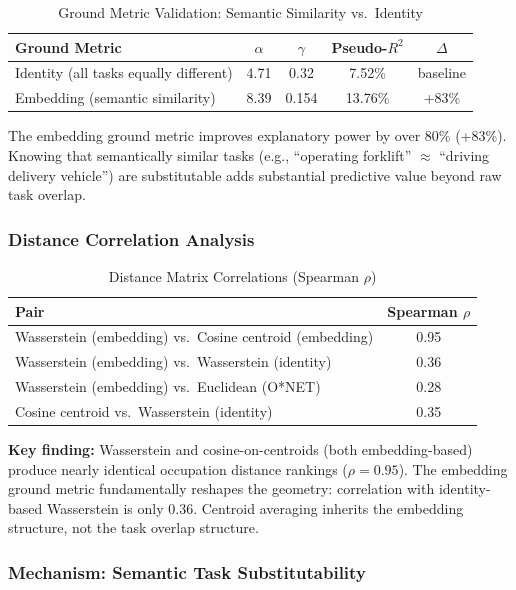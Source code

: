 \documentclass[12pt]{article}
\begin{document}
\begin{table}[h!]
\centering
\caption{Ground Metric Validation: Semantic Similarity vs.\ Identity}
\label{tab:ground-metric}
\begin{tabular}{lcccc}
\toprule
\textbf{Ground Metric} & $\alpha$ & $\gamma$ & Pseudo-$R^2$ & $\Delta$ \\
\midrule
Identity (all tasks equally different) & 4.71 & 0.32 & 7.52\% & baseline \\
Embedding (semantic similarity) & 8.39 & 0.154 & 13.76\% & +83\% \\
\bottomrule
\end{tabular}
\end{table}


The embedding ground metric improves explanatory power by over 80\% (+83\%). Knowing that semantically similar tasks (e.g., ``operating forklift'' $\approx$ ``driving delivery vehicle'') are substitutable adds substantial predictive value beyond raw task overlap.


\subsubsection{Distance Correlation Analysis}


\begin{table}[h!]
\centering
\caption{Distance Matrix Correlations (Spearman $\rho$)}
\label{tab:distance-correlations}
\begin{tabular}{lc}
\toprule
\textbf{Pair} & \textbf{Spearman $\rho$} \\
\midrule
Wasserstein (embedding) vs.\ Cosine centroid (embedding) & 0.95 \\
Wasserstein (embedding) vs.\ Wasserstein (identity) & 0.36 \\
Wasserstein (embedding) vs.\ Euclidean (O*NET) & 0.28 \\
Cosine centroid vs.\ Wasserstein (identity) & 0.35 \\
\bottomrule
\end{tabular}
\end{table}


\textbf{Key finding:} Wasserstein and cosine-on-centroids (both embedding-based) produce nearly identical occupation distance rankings ($\rho = 0.95$). The embedding ground metric fundamentally reshapes the geometry: correlation with identity-based Wasserstein is only 0.36. Centroid averaging inherits the embedding structure, not the task overlap structure.


\subsubsection{Mechanism: Semantic Task Substitutability}
\end{document}
